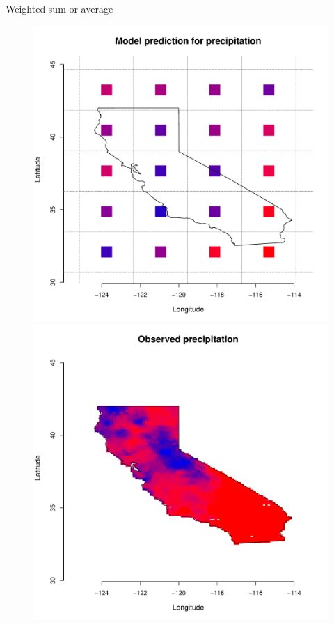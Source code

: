 \documentclass[mathserif, 11pt, t]{beamer}
\begin{document}
\begin{frame}{Weighted sum or average}
\begin{figure}
\begin{center}
\includegraphics[scale=0.18]{figs/cal_mod_box1.pdf}
\includegraphics[scale=0.18]{figs/cal_mod_box2.pdf}

\end{center}
\end{figure}
\end{frame}
\end{document}
